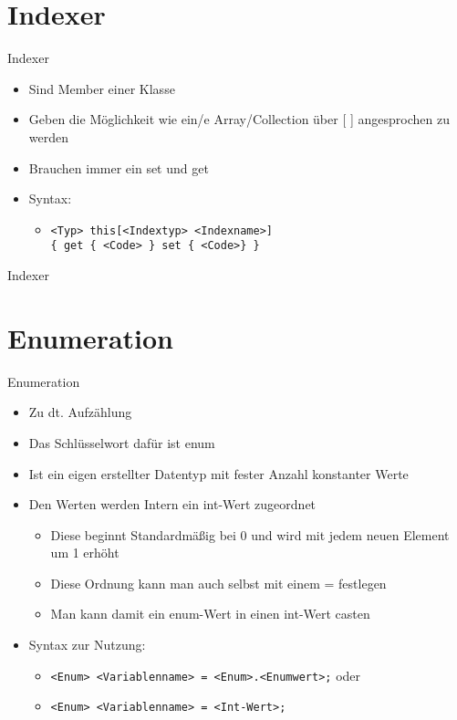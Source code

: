 \section{Indexer}
\begin{frame}{Indexer}
	\begin{itemize}
		\item Sind Member einer Klasse
		\item Geben die Möglichkeit wie ein/e Array/Collection über \alert{[ ]} angesprochen zu werden
		\item Brauchen immer ein \alert{set} und \alert{get}
		\item Syntax:
		\begin{itemize}
			\item \texttt{\alert{<Typ>} this[\alert{<Indextyp> <Indexname>}]\\ \{ get \{ \alert{<Code>} \} set \{ \alert{<Code>}\} \}}
		\end{itemize}
	\end{itemize}
\end{frame}

\begin{frame}{Indexer}
	
\end{frame}

\section{Enumeration}
\begin{frame}{Enumeration}
	\begin{itemize}
		\item Zu dt. Aufzählung
		\item Das Schlüsselwort dafür ist \alert{enum}
		\item Ist ein eigen erstellter Datentyp mit fester Anzahl konstanter Werte
		\item Den Werten werden Intern ein \alert{int}-Wert zugeordnet
		\begin{itemize}
			\item Diese beginnt Standardmäßig bei 0 und wird mit jedem neuen Element um 1 erhöht
			\item Diese Ordnung kann man auch selbst mit einem \alert{=} festlegen
			\item Man kann damit ein \alert{enum}-Wert in einen \alert{int}-Wert casten			
		\end{itemize}
		\item Syntax zur Nutzung:
		\begin{itemize}
			\item \texttt{\alert{<Enum> <Variablenname>} = \alert{<Enum>}.\alert{<Enumwert>};} oder
			\item \texttt{\alert{<Enum> <Variablenname>} = \alert{<Int-Wert>};}
		\end{itemize}
	\end{itemize}
\end{frame}

